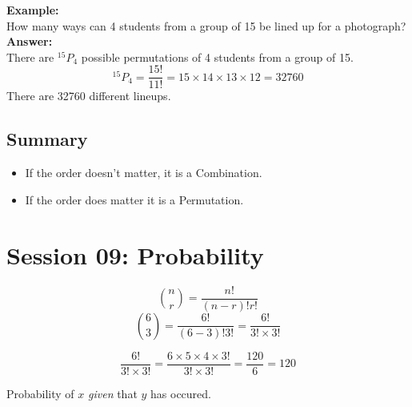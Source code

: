 \documentclass[]{report}
\begin{document}
\noindent \textbf{Example:}\\	
How many ways can 4 students from a group of 15 be lined up for a photograph?\\

\noindent \textbf{Answer:	}\\
There are $^{15}P_4$ possible permutations of 4 students from a group of 15.
\[ ^{15}P_4 = \frac{15!}{11!} = 15\times 14\times 13\times 12 = 32760 \]
There are 32760 different lineups.








\subsection*{Summary}
\begin{itemize}
	\item If the order doesn't matter, it is a Combination.
	\item If the order does matter it is a Permutation.
\end{itemize}


	\section*{Session 09: Probability}


\begin{framed}
	
	\[ {n \choose r} = \frac{n!}{(n-r)! r!} \]
	\smallskip
	\[ {6 \choose 3} = \frac{6!}{(6-3)! 3!} = \frac{6!}{3! \times 3!}\]
	
	\smallskip
	\[ \frac{6!}{3! \times 3!} = \frac{6 \times 5 \times 4 \times 3!}{3! \times 3!} = \frac{120}{6} = 120\]
	\smallskip
\end{framed}




Probability of $x$ \emph{given} that $y$ has occured.

\end{document}
